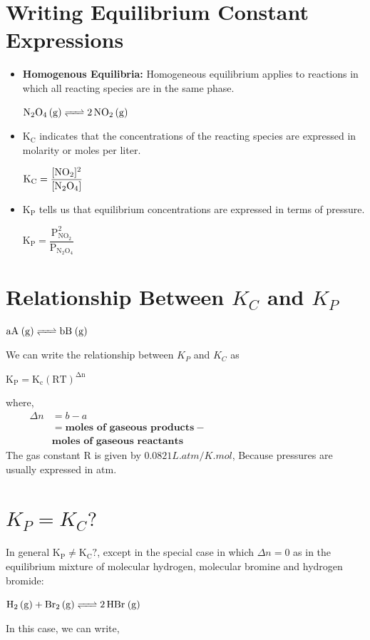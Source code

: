 \documentclass[a4paper,12pt,twocolumn]{article}
\begin{document}
\section{Writing Equilibrium Constant Expressions}
\begin{itemize}
    \item \textbf{Homogenous Equilibria:} Homogeneous equilibrium applies to reactions in which all reacting species are in the same phase.
          \begin{center}
            $\ce{N2O4 (g) <=> 2NO2 (g)}$
          \end{center}
    \item $\mathrm{K_C}$ indicates that the concentrations of the reacting species are expressed in molarity or moles per liter.
          \begin{center}
            $\mathrm{K_C} = \dfrac{[\ce{NO2}]^2}{[\ce{N2O4}]}$
          \end{center}
    \item $\mathrm{K_P}$ tells us that equilibrium concentrations are expressed in terms of pressure.
          \begin{center}
            $\mathrm{K_P} = \dfrac{\mathrm{P^2_{NO_2}}}{\mathrm{P_{N_2O_4}}}$
          \end{center}
\end{itemize}

\section{Relationship Between $K_C$ and $K_P$}
\begin{center}
    $\ce{aA (g) <=> bB (g)}$
\end{center}
We can write the relationship between $K_P$ and $K_C$ as
\begin{center}
    $\mathrm{K_{P}=K_{\mathrm{c}}(RT)^{\Delta n}}$
\end{center}
where,
\\
$\begin{aligned}
    \quad \quad \Delta n & = b-a                                  \\
    \quad \quad          & = \textbf{moles of gaseous products} - \\ 
    \quad \quad          & \textbf{moles of gaseous reactants}    
\end{aligned}$
\\
The gas constant R is given by $0.0821 L.atm/K.mol$, Because pressures are usually expressed in atm.
\section{$K_P = K_C ?$}
In general $\mathrm{K_P \neq K_C ?}$, except in the special case in which $\Delta n  = 0$ as in the equilibrium mixture of molecular hydrogen, molecular bromine and hydrogen bromide:\\ 
\begin{center}
    $\ce{H2 (g) + Br2 (g) <=> 2HBr (g)}$
\end{center}
In this case, we can write, \\
 
\end{document}
